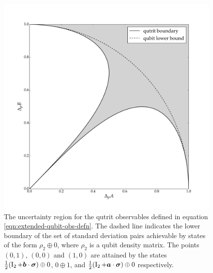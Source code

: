\begin{center}
  \begin{figure}[ht]
    \includegraphics[width=\textwidth]{figs/extended-qubit-error-region-bw}
    \caption[The uncertainty region for the qutrit observables defined in equation \eqref{eqn:extended-qubit-obs-defn}]{The uncertainty region for the qutrit observables defined in equation \eqref{eqn:extended-qubit-obs-defn}. The dashed line indicates the lower boundary of the set of standard deviation pairs achievable by states of the form $\rho_2 \oplus 0$, where $\rho_2$ is a qubit density matrix. The points $(0,1)$, $(0,0)$ and $(1,0)$ are attained by the states $\frac{1}{2}(\operatorname{I}_2+\bm{b}\cdot{\boldsymbol\sigma})\oplus 0$, $0\oplus 1$, and $\frac{1}{2}(\operatorname{I}_2+\bm{a}\cdot{\boldsymbol\sigma})\oplus 0$ respectively.}
    \label{fig:extended-qubit-uncertainty-region}
  \end{figure}
\end{center}

